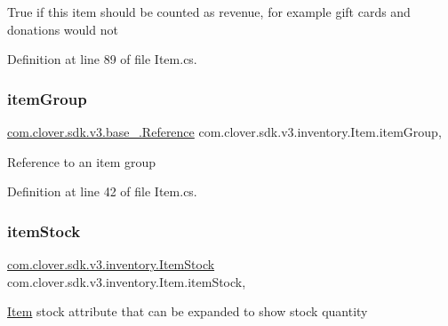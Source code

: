True if this item should be counted as revenue, for example gift cards and donations would not 



Definition at line 89 of file Item.\+cs.

\mbox{\label{classcom_1_1clover_1_1sdk_1_1v3_1_1inventory_1_1_item_a687ac7bd9f49ab5a607540892f418a22}} 
\subsubsection{\texorpdfstring{item\+Group}{itemGroup}}
{\footnotesize\ttfamily \hyperlink{classcom_1_1clover_1_1sdk_1_1v3_1_1base___1_1_reference}{com.\+clover.\+sdk.\+v3.\+base\+\_\+.\+Reference} com.\+clover.\+sdk.\+v3.\+inventory.\+Item.\+item\+Group\hspace{0.3cm}{\ttfamily [get]}, {\ttfamily [set]}}



Reference to an item group 



Definition at line 42 of file Item.\+cs.

\mbox{\label{classcom_1_1clover_1_1sdk_1_1v3_1_1inventory_1_1_item_a6edcd5227a75b71a8ae9436595219f6f}} 
\subsubsection{\texorpdfstring{item\+Stock}{itemStock}}
{\footnotesize\ttfamily \hyperlink{classcom_1_1clover_1_1sdk_1_1v3_1_1inventory_1_1_item_stock}{com.\+clover.\+sdk.\+v3.\+inventory.\+Item\+Stock} com.\+clover.\+sdk.\+v3.\+inventory.\+Item.\+item\+Stock\hspace{0.3cm}{\ttfamily [get]}, {\ttfamily [set]}}



\hyperlink{classcom_1_1clover_1_1sdk_1_1v3_1_1inventory_1_1_item}{Item} stock attribute that can be expanded to show stock quantity 



